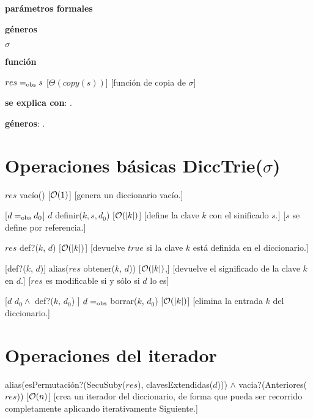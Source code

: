 \begin{Interfaz}
  \textbf{parámetros formales}\parindent\\
  \parbox{1.7cm}{\textbf{géneros}} $\sigma$\\
  \parbox[t]{1.7cm}{\textbf{función}}\parbox[t]{\textwidth-2\parindent-1.7cm}{    	
    {$res =_{\mathrm{obs}} s$}
    [$\Theta(copy(s))$]
    [función de copia de $\sigma$]
    }
      
  \textbf{se explica con}: .

  \textbf{géneros}: .

  \section*{Operaciones básicas DiccTrie($\sigma$)}

  {$res$ \igobs vacío()}
  [$\mathcal{O}(1)$]
  [genera un diccionario vacío.]

  [$d =_{\mathrm{obs}} d_0$]  
  {$d$ \igobs definir($k, s, d_0$)}
  [$\mathcal{O}(|k|)$]
  [define la clave $k$ con el sinificado $s$.]
  [$s$ se define por referencia.]
    
  {$res$ \igobs def?($k$, $d$) }
  [$\mathcal{O}(|k|)$]
  [devuelve $true$ si la clave $k$ está definida en el diccionario.]
  
  [def?($k$, $d$)]  
  {alias($res$ \igobs obtener($k$, $d$))}
  [$\mathcal{O}(|k|)$,]
  [devuelve el significado de la clave $k$ en $d$.]
  [$res$ es modificable si y sólo si $d$ lo es]
  
  [$d$ \igobs $d_0 \land$ def?($k$, $d_0$) ]
  {$d =_{\mathrm{obs}}$ borrar($k$, $d_0$)}
  [$\mathcal{O}(|k|)$]
  [elimina la entrada $k$ del diccionario.] 
  
  \section*{Operaciones del iterador}

  {alias(esPermutación?(SecuSuby($res$), clavesExtendidas($d$))) $\land$ vacia?(Anteriores($res$))}
  [$\mathcal{O}(n)$]
  [crea un iterador del diccionario, de forma que pueda ser recorrido completamente aplicando iterativamente Siguiente.]
  

\end{Interfaz}
